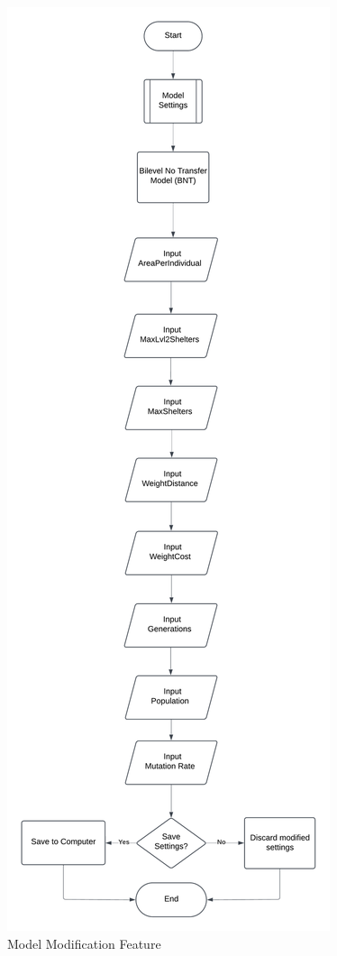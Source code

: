 \begin{appendices}
\begin{centerappendixtitle}
		\begin{figure}[h]
			\centering
			\caption{Model Modification Feature}
			\label{modelFLow}
			\includegraphics[width=\linewidth]{appendix/modelset f}
		\end{figure}
		

\end{centerappendixtitle}
\end{appendices}
